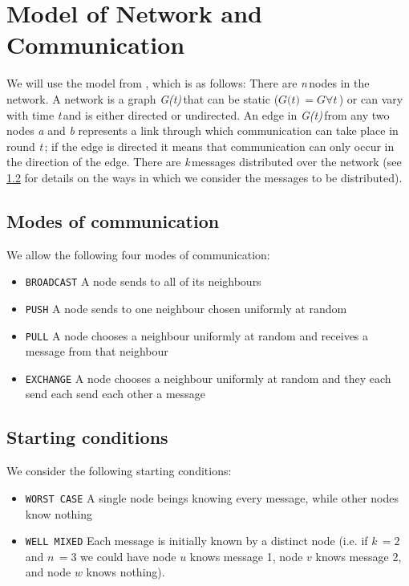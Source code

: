 \documentclass{article} %
\def\numNodes{\textit{n}\,}
\def\graph{\textit{G(t)}\,}
\def\graphtime{\textit{t}\,}
\def\numMessages{\textit{k}\,}
\begin{document}
\section{Model of Network and Communication}
We will use the model from \cite{haeupler2011analyzing}, which is as follows: There are \numNodes nodes in the network. A network is a graph \graph that can be static ($\graph = G  \forall \graphtime$) or can vary with time \graphtime and is either directed or undirected. An edge in \graph from any two nodes \textit{a} and \textit{b} represents a link through which communication can take place in round \graphtime; if the edge is directed it means that communication can only occur in the direction of the edge. There are \numMessages messages distributed over the network (see \ref{subsec:startingconditions} for details on the ways in which we consider the messages to be distributed).  

\subsection{Modes of communication}\label{subsec:communication}
We allow the following four modes of communication:
\begin{itemize}
	\item \texttt{BROADCAST} A node sends to all of its neighbours
	\item \texttt{PUSH} A node sends to one neighbour chosen uniformly at random
	\item \texttt{PULL} A node chooses a neighbour uniformly at random and receives a message from that neighbour
	\item \texttt{EXCHANGE} A node chooses a neighbour uniformly at random and they each send each send each other a message
\end{itemize}

\subsection{Starting conditions}\label{subsec:startingconditions}
We consider the following starting conditions:
\begin{itemize}
	\item \texttt{WORST CASE} A single node beings knowing every message, while other nodes know nothing
	\item \texttt{WELL MIXED} Each message is initially known by a distinct node (i.e. if $\numMessages=2$ and $\numNodes=3$ we could have node $u$ knows message 1, node $v$ knows message 2, and node $w$ knows nothing).
\end{itemize}
\end{document}
